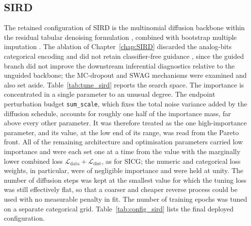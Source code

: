 \subsection{SIRD}

The retained configuration of SIRD is the multinomial diffusion backbone \citep{hoogeboom2021multinomial} within the residual tabular denoising formulation \citep{kotelnikov2023tabddpm, ho2020denoising}, combined with bootstrap multiple imputation \citep{bartlett2020bootstrap}. The ablation of Chapter~\ref{chap:SIRD} discarded the analog-bits categorical encoding and did not retain classifier-free guidance \citep{ho2022classifier}, since the guided branch did not improve the downstream inferential diagnostics relative to the unguided backbone; the MC-dropout \citep{gal2016dropout} and SWAG \citep{maddox2019simple} mechanisms were examined and also set aside. Table~\ref{tab:tune_sird} reports the search space. The importance is concentrated in a single parameter to an unusual degree. The endpoint perturbation budget \texttt{sum\_scale}, which fixes the total noise variance added by the diffusion schedule, accounts for roughly one half of the importance mass, far above every other parameter. It was therefore treated as the one high-importance parameter, and its value, at the low end of its range, was read from the Pareto front. All of the remaining architecture and optimisation parameters carried low importance and were each set one at a time from the value with the marginally lower combined loss $\mathcal{L}_{\mathrm{data}} + \mathcal{L}_{\mathrm{dist}}$, as for SICG; the numeric and categorical loss weights, in particular, were of negligible importance and were held at unity. The number of diffusion steps was kept at the smallest value for which the tuning loss was still effectively flat, so that a coarser and cheaper reverse process could be used with no measurable penalty in fit. The number of training epochs was tuned on a separate categorical grid. Table~\ref{tab:config_sird} lists the final deployed configuration.

